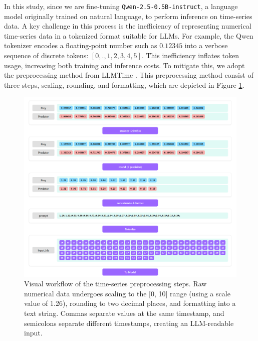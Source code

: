 \documentclass{article}
\begin{document}
In this study, since we are fine-tuning \texttt{Qwen-2.5-0.5B-instruct}, a language model originally trained on natural language, to perform inference on time-series data. A key challenge in this process is the inefficiency of representing numerical time-series data in a tokenized format suitable for LLMs. For example, the Qwen tokenizer encodes a floating-point number such as $0.12345$ into a verbose sequence of discrete tokens: $[0, ., 1, 2, 3, 4, 5]$. This inefficiency inflates token usage, increasing both training and inference costs. To mitigate this, we adopt the preprocessing method from LLMTime \cite{gruver2024largelanguagemodelszeroshot}. This preprocessing method consist of three steps, scaling, rounding, and formatting, which are depicted in Figure \ref{fig:preprocessing_visual_workflow}. 

\begin{figure}[!htbp] %
    \centering
    \includegraphics[width=0.9\linewidth]{M2 Course Work/Images/preprocess_vis.png} 
    \caption{Visual workflow of the time-series preprocessing steps. Raw numerical data undergoes scaling to the [0, 10] range (using a scale value of 1.26), rounding to two decimal places, and formatting into a text string. Commas separate values at the same timestamp, and semicolons separate different timestamps, creating an LLM-readable input.}
    \label{fig:preprocessing_visual_workflow}
\end{figure}
\end{document}
